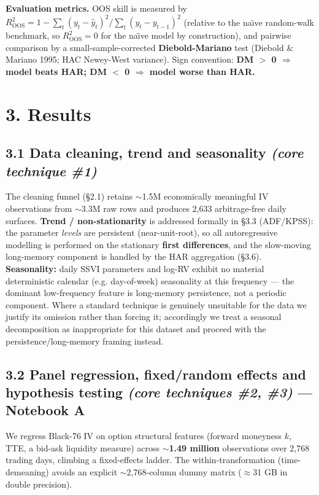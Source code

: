 \documentclass[10pt,a4paper]{article}
\begin{document}
\textbf{Evaluation metrics.} OOS skill is measured by $R^2_\text{OOS} = 1 - \sum_t (y_t-\hat y_t)^2 / \sum_t (y_t-y_{t-1})^2$ (relative to the na\"{\i}ve random-walk benchmark, so $R^2_\text{OOS}=0$ for the na\"{\i}ve model by construction), and pairwise comparison by a small-sample-corrected \textbf{Diebold-Mariano} test (Diebold \& Mariano 1995; HAC Newey-West variance). Sign convention: \textbf{DM $>$ 0 $\Rightarrow$ model beats HAR; DM $<$ 0 $\Rightarrow$ model worse than HAR.}

\section*{3. Results}

\subsection*{3.1 Data cleaning, trend and seasonality \textit{(core technique \#1)}}

The cleaning funnel (\S{}2.1) retains $\sim$1.5M economically meaningful IV observations from $\sim$3.3M raw rows and produces 2,633 arbitrage-free daily surfaces. \textbf{Trend / non-stationarity} is addressed formally in \S{}3.3 (ADF/KPSS): the parameter \textit{levels} are persistent (near-unit-root), so all autoregressive modelling is performed on the stationary \textbf{first differences}, and the slow-moving long-memory component is handled by the HAR aggregation (\S{}3.6). \textbf{Seasonality:} daily SSVI parameters and log-RV exhibit no material deterministic calendar (e.g. day-of-week) seasonality at this frequency --- the dominant low-frequency feature is long-memory persistence, not a periodic component. Where a standard technique is genuinely unsuitable for the data we justify its omission rather than forcing it; accordingly we treat a seasonal decomposition as inappropriate for this dataset and proceed with the persistence/long-memory framing instead.

\subsection*{3.2 Panel regression, fixed/random effects and hypothesis testing \textit{(core techniques \#2, \#3)} --- Notebook A}

We regress Black-76 IV on option structural features (forward moneyness $k$, TTE, a bid-ask liquidity measure) across \textbf{$\sim$1.49 million} observations over 2,768 trading days, climbing a fixed-effects ladder. The within-transformation (time-demeaning) avoids an explicit $\sim$2,768-column dummy matrix ($\approx$31 GB in double precision).
\end{document}
